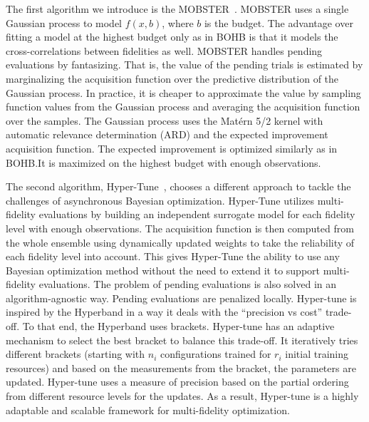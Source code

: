 The first algorithm we introduce is the MOBSTER~\cite{klein2020model}. MOBSTER uses a single Gaussian process to model $f(x,b)$, where $b$ is the budget. The advantage over fitting a model at the highest budget only as in BOHB is that it models the cross-correlations between fidelities as well. MOBSTER handles pending evaluations by fantasizing. That is, the value of the pending trials is estimated by marginalizing the acquisition function over the predictive distribution of the Gaussian process. In practice, it is cheaper to approximate the value by sampling function values from the Gaussian process and averaging the acquisition function over the samples. The Gaussian process uses the Matérn 5/2 kernel with automatic relevance determination (ARD) and the expected improvement acquisition function. The expected improvement is optimized similarly as in BOHB.\@ It is maximized on the highest budget with enough observations.

The second algorithm, Hyper-Tune~\cite{li2022hyper}, chooses a different approach to tackle the challenges of asynchronous Bayesian optimization. Hyper-Tune utilizes multi-fidelity evaluations by building an independent surrogate model for each fidelity level with enough observations. The acquisition function is then computed from the whole ensemble using dynamically updated weights to take the reliability of each fidelity level into account. This gives Hyper-Tune the ability to use any Bayesian optimization method without the need to extend it to support multi-fidelity evaluations. The problem of pending evaluations is also solved in an algorithm-agnostic way. Pending evaluations are penalized locally. Hyper-tune is inspired by the Hyperband in a way it deals with the ``precision vs cost'' trade-off. To that end, the Hyperband uses brackets. Hyper-tune has an adaptive mechanism to select the best bracket to balance this trade-off. It iteratively tries different brackets (starting with $n_i$ configurations trained for $r_i$ initial training resources) and based on the measurements from the bracket, the parameters are updated. Hyper-tune uses a measure of precision based on the partial ordering from different resource levels for the updates. As a result, Hyper-tune is a highly adaptable and scalable framework for multi-fidelity optimization.


